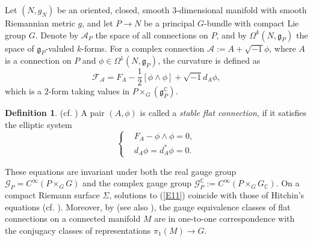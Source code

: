 \documentclass[12pt, twoside]{article}
\theoremstyle{definition}
\newtheorem{definition}[theorem]{Definition}
\numberwithin{equation}{section}
\def \C {\mathbb{C}}
\def\Om{\Omega}
\begin{document}
Let $(N,g_{N})$ be an oriented, closed, smooth $3$-dimensional manifold with smooth Riemannian metric $g$,
 and let $P\rightarrow N$ be a principal $G$-bundle with  compact Lie group $G$. 
 Denote by $\mathcal{A}_{P}$ the space of all connections on $P$, 
 and by $\Om^{k}(N,\mathfrak{g}_{P})$ the space of  $\mathfrak{g}_{P}$-valuled $k$-forms. 
 For a complex connection $\mathcal{A}:=A+\sqrt{-1}\phi$, where $A$ is a connection on $P$ and $\phi\in\Om^{1}(N,\mathfrak{g}_{P})$, 
 the curvature is defined as
\[\mathcal{F}_{\mathcal{A}}=F_{A}-\frac{1}{2}[\phi\wedge\phi]+\sqrt{-1}d_{A}\phi,\]
which is a $2$-form taking values in $P\times_{G}(\mathfrak{g}_{P}^{\C})$.

\begin{definition}(cf. \cite{Cor88,GU12})
	A pair $(A,\phi)$ is called a \textit{stable flat connection}, if it satisfies the elliptic system 
	\begin{equation*}
	\left\{
	\begin{split}
	&F_{A}-\phi\wedge\phi=0,\\
	&d_{A}\phi=d_{A}^{\ast}\phi=0.
	\end{split}
	\right.
	\end{equation*}
\end{definition}
These equations are invariant under both the real gauge group $\mathcal{G}_{P}=C^{\infty}(P\times_{G}G)$ 
and  the complex gauge group $\mathcal{G}^{\C}_{P}:=C^{\infty}(P\times_{G}G_{\C})$. 
On a compact Riemann surface $\Sigma$, solutions to (\ref{E11}) coincide with those of Hitchin's equations (cf. \cite{Hit87}). 
Moreover, by \cite[Proposition 2.2.3]{DK90} (see also \cite[Proposition 1.2.6]{Kob87}), 
the gauge equivalence classes of flat connections on a connected manifold $M$ are in one-to-one correspondence 
with the conjugacy classes of representations $\pi_{1}(M)\rightarrow G$. 
\end{document}
